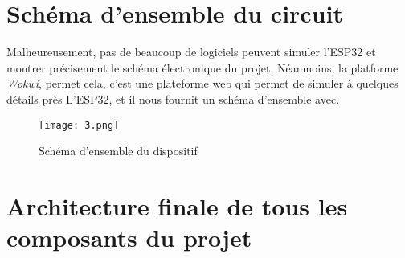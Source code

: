 \section{Schéma d'ensemble du circuit}
Malheureusement, pas de beaucoup de logiciels peuvent simuler l'ESP32 et montrer précisement le schéma électronique du projet. Néanmoins, la platforme \textit{Wokwi}, permet cela, c'est une plateforme web qui permet de simuler à quelques détails près L'ESP32, et il nous fournit un schéma d'ensemble avec.\\[0.3cm]

\begin{figure}[H]
	\centering
	\texttt{[image: 3.png]}
	\caption{Schéma d'ensemble du dispositif}
\end{figure}


\section{Architecture finale de tous les composants du projet}


